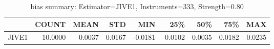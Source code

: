 \begin{table}[ht]
\centering
\caption{bias summary: Estimator=JIVE1, Instruments=333, Strength=0.80}
\begin{tabular}{lrrrrrrrr}
\toprule
 & COUNT & MEAN & STD & MIN & 25\% & 50\% & 75\% & MAX \\
\midrule
JIVE1 & 10.0000 & 0.0037 & 0.0167 & -0.0181 & -0.0102 & 0.0035 & 0.0182 & 0.0235 \\
\bottomrule
\end{tabular}
\end{table}
